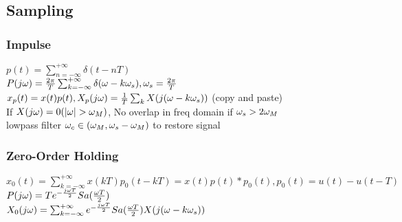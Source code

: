 \subsection{Sampling}
\subsubsection*{Impulse}
$p(t)=\sum_{n=-\infty}^{+\infty} \delta(t-nT)$\\
$P(j\omega)=\frac{2\pi}{T}\sum_{k=-\infty}^{+\infty} \delta(\omega-k\omega_s), \omega_s=\frac{2\pi}{T}$\\
$x_p(t)=x(t)p(t), X_p(j\omega) = \frac{1}{T}\sum_k X(j(\omega-k\omega_s))$ (copy and paste)\\
If $X(j\om)=0(|\om|>\om_M)$, No overlap in freq domain if $\omega_s>2\omega_M$\\
lowpass filter $\omega_c\in(\omega_M,\omega_s - \omega_M)$ to restore signal
\subsubsection*{Zero-Order Holding}
$x_0(t)=\sum_{k=-\infty}^{+\infty} x(kT)p_0(t-kT)=x(t)p(t)*p_0(t), p_0(t)=u(t)-u(t-T)$\\
$P(j\omega)=Te^{-\frac{j\omega T}{2}} Sa(\frac{\omega T}{2})$\\
$X_0(j\omega)=\sum_{k=-\infty}^{+\infty} e^{-\frac{j\omega T}{2}} Sa(\frac{\omega T}{2}) X(j(\omega-k\omega_s))$